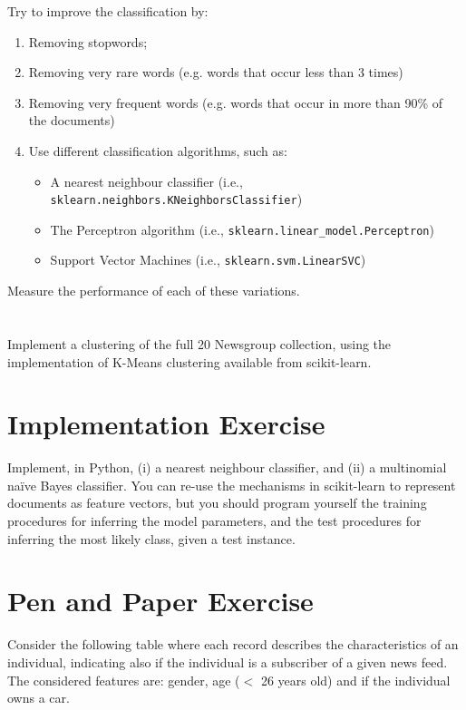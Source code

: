 \documentclass[12pt]{article}
\begin{document}
Try to improve the classification by:
\begin{enumerate}
\item Removing stopwords;
\item Removing very rare words (e.g. words that occur less than 3 times)
\item Removing very frequent words (e.g. words that occur in more than 90\% of the documents)
\item Use different classification algorithms, such as:
\begin{itemize}
\item A nearest neighbour classifier (i.e., \verb+sklearn.neighbors.KNeighborsClassifier+)
\item The Perceptron algorithm (i.e., \verb+sklearn.linear_model.Perceptron+)
\item Support Vector Machines (i.e., \verb+sklearn.svm.LinearSVC+)
\end{itemize}
\end{enumerate}

Measure the performance of each of these variations.

\section{}

Implement a clustering of the full 20 Newsgroup collection, using the implementation of K-Means clustering available from scikit-learn.

\section{Implementation Exercise}

Implement, in Python, (i) a nearest neighbour classifier, and (ii) a multinomial  na\"ive  Bayes  classifier. You can re-use the mechanisms in scikit-learn to represent documents as feature vectors, but you should program yourself the training  procedures for inferring the model parameters, and the test procedures for inferring the most likely class, given a test instance.

\section{Pen and Paper Exercise}

Consider the following table where each record describes the characteristics of an individual, indicating also if the individual is a subscriber of a given news feed. The considered features are: gender, age ($<$ 26 years old) and if the individual owns a car.
\end{document}
